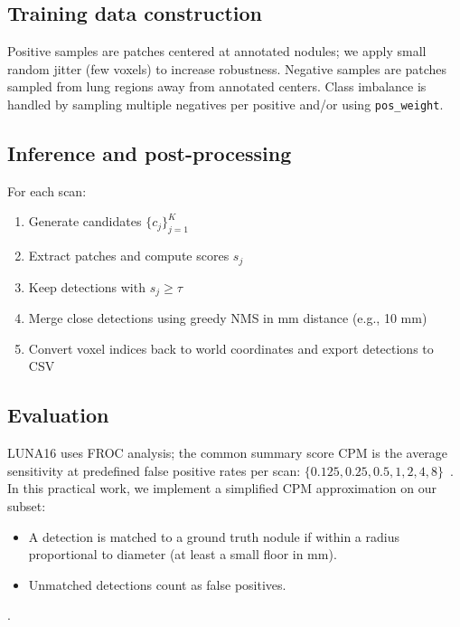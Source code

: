\subsection{Training data construction}
Positive samples are patches centered at annotated nodules; we apply small random jitter (few voxels) to increase robustness. Negative samples are patches sampled from lung regions away from annotated centers. Class imbalance is handled by sampling multiple negatives per positive and/or using \texttt{pos\_weight}.

\subsection{Inference and post-processing}
For each scan:
\begin{enumerate}
  \item Generate candidates $\{c_j\}_{j=1}^{K}$
  \item Extract patches and compute scores $s_j$
  \item Keep detections with $s_j \ge \tau$
  \item Merge close detections using greedy NMS in mm distance (e.g., 10 mm)
  \item Convert voxel indices back to world coordinates and export detections to CSV
\end{enumerate}

\subsection{Evaluation}
LUNA16 uses FROC analysis; the common summary score CPM is the average sensitivity at predefined false positive rates per scan: $\{0.125, 0.25, 0.5, 1, 2, 4, 8\}$~\cite{setio2017luna16}. In this practical work, we implement a simplified CPM approximation on our subset:
\begin{itemize}
  \item A detection is matched to a ground truth nodule if within a radius proportional to diameter (at least a small floor in mm).
  \item Unmatched detections count as false positives.
\end{itemize}.